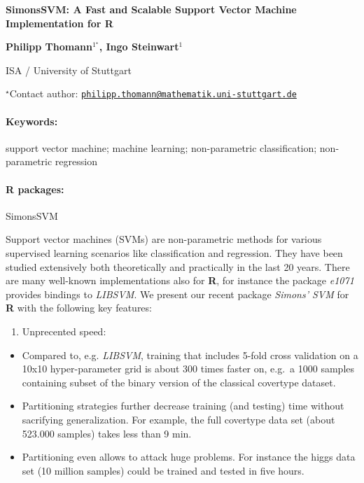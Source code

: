 \documentclass[11pt, a4paper]{article}
\renewcommand{\title}[1]{\begin{center}{\bf \LARGE #1}\end{center}}
\newcommand{\keywords}{\paragraph{Keywords:}}
\newcommand{\packages}{\paragraph{R packages:}}
\providecommand{\tightlist}{%
  \setlength{\itemsep}{0pt}\setlength{\parskip}{0pt}}
\begin{document}
\pagestyle{empty}

\title{SimonsSVM: A Fast and Scalable Support Vector Machine Implementation for
R}

\begin{center}
  {\bf Philipp Thomann$^{1^\star}$, Ingo Steinwart$^{1}$}
\end{center}

\vskip 0.3cm

\begin{affiliations}
\begin{enumerate}
\begin{minipage}{0.915\textwidth}
\centering
\item ISA / University of Stuttgart \\[-2pt]
\end{minipage}
\end{enumerate}
$^\star$Contact author: \href{mailto:philipp.thomann@mathematik.uni-stuttgart.de}{\nolinkurl{philipp.thomann@mathematik.uni-stuttgart.de}}\\
\end{affiliations}

\vskip 0.5cm

\begin{minipage}{0.915\textwidth}
\keywords support vector machine; machine learning; non-parametric classification;
non-parametric regression
\packages SimonsSVM
\end{minipage}

\vskip 0.8cm

Support vector machines (SVMs) are non-parametric methods for various
supervised learning scenarios like classification and regression. They
have been studied extensively both theoretically and practically in the
last 20 years. There are many well-known implementations also for
\textbf{R}, for instance the package \emph{e1071} provides bindings to
\emph{LIBSVM}. We present our recent package \emph{Simons' SVM} for
\textbf{R} with the following key features:

\begin{enumerate}
\def\labelenumi{\arabic{enumi}.}
\tightlist
\item
  Unprecented speed:
\end{enumerate}

\begin{itemize}
\tightlist
\item
  Compared to, e.g. \emph{LIBSVM}, training that includes 5-fold cross
  validation on a 10x10 hyper-parameter grid is about 300 times faster
  on, e.g.~a 1000 samples containing subset of the binary version of the
  classical covertype dataset.
\item
  Partitioning strategies further decrease training (and testing) time
  without sacrifying generalization. For example, the full covertype
  data set (about 523.000 samples) takes less than 9 min.
\item
  Partitioning even allows to attack huge problems. For instance the
  higgs data set (10 million samples) could be trained and tested in
  five hours.
\end{itemize}
\end{document}
